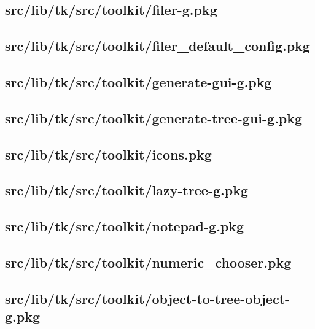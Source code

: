 \subsection{src/lib/tk/src/toolkit/filer-g.pkg}


\subsection{src/lib/tk/src/toolkit/filer\_default\_config.pkg}


\subsection{src/lib/tk/src/toolkit/generate-gui-g.pkg}


\subsection{src/lib/tk/src/toolkit/generate-tree-gui-g.pkg}


\subsection{src/lib/tk/src/toolkit/icons.pkg}


\subsection{src/lib/tk/src/toolkit/lazy-tree-g.pkg}


\subsection{src/lib/tk/src/toolkit/notepad-g.pkg}


\subsection{src/lib/tk/src/toolkit/numeric\_chooser.pkg}


\subsection{src/lib/tk/src/toolkit/object-to-tree-object-g.pkg}


